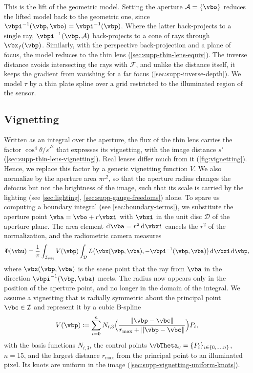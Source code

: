 This is the lift of the geometric model. Setting the aperture $\mathcal{A}=\{\vbo\}$ reduces the lifted model back to the geometric one, since $\vbpi^{-1}(\vbp,\vbo)=\vbpi^{-1}(\vbp)$. Where the latter back-projects to a single ray,
$\vbpi^{-1}(\vbp,\mathcal{A})$ back-projects to a cone of rays
through $\vbx_f(\vbp)$. Similarly, with the perspective back-projection and a plane of focus, the model reduces to
the thin lens (\cref{sec:supp-thin-lens-equiv}). The inverse distance
avoids intersecting the rays with $\mathcal{F}$, and unlike the
distance itself, it keeps the gradient from vanishing for a far focus
\cite{unified-inverse-depth,direct-sparse-odometry}
(\cref{sec:supp-inverse-depth}). We model $\tau$ by a thin plate
spline \cite{thin-plate-spline} over a grid restricted to the illuminated region
of the sensor.

\subsection{Vignetting}
\label{sec:vignetting}
Written as an integral over the aperture, the flux of the thin lens
carries the factor $\cos^4\theta/s'^2$ that expresses its vignetting, with the image distance $s'$~\cite{Goossens_2019}
(\cref{sec:supp-thin-lens-vignetting}). Real lenses differ much
from it (\cref{fig:vignetting}). Hence, we replace this factor by a generic
vignetting function $V$. We also normalize by the aperture area $\pi r^2$,
so that the aperture radius changes the defocus but not the
brightness of the image, such that its scale is carried by the lighting (see \cref{sec:lighting}, \ref{sec:supp-gauge-freedoms}) alone. To spare us computing a boundary integral (see \cref{sec:boundary-terms}), we substitute the aperture point
$\vba=\vbo+r\vbxi$ with $\vbxi$ in the unit disc $\mathcal{D}$ of the
aperture plane. The area element $\odif{\vba}=r^2\odif{\vbxi}$
cancels the $r^2$ of the normalization, and the radiometric camera
measures
\begin{equation}
\label{eq:rad-flux-with-vignetting}
    \Phi(\vbu)
    = \frac{1}{\pi}\int_{\mathcal{I}_{\vbu}}V(\vbp)
    \int_{\mathcal{D}}L\bigl(\vbx(\vbp,\vba),-\vbpi^{-1}(\vbp,\vba)\bigr)\odif{\vbxi}\odif{\vbp},
\end{equation}
where $\vbx(\vbp,\vba)$ is the scene point that the ray from $\vba$ in
the direction $\vbpi^{-1}(\vbp,\vba)$ meets. The radius now
appears only in the position of the aperture point, and no longer in
the domain of the integral. We assume a vignetting
that is radially symmetric about the principal point
$\vbc\in\mathcal{I}$ and represent it by a cubic B-spline
\cite{piegl1997nurbs}
\begin{equation}
    V(\vbp) \coloneqq \sum_{i=0}^{n} N_{i,3}\Bigl(\frac{\lVert \vbp-\vbc \rVert}{r_{\text{max}} + \lVert \vbp-\vbc \rVert}\Bigr)P_{i},
\end{equation}
with the basis functions $N_{i,3}$, the control points
$\vbTheta_v = \{P_{i}\}_{i\in\{0,\dots,n\}}$, $n=15$, and the largest
distance $r_{\text{max}}$ from the principal point to an illuminated
pixel. Its knots are uniform in the image
(\cref{sec:supp-vignetting-uniform-knots}).

